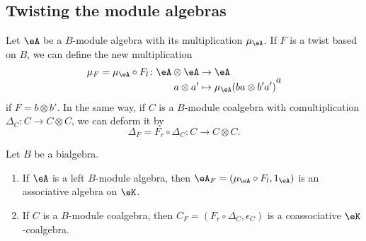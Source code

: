 \subsection{Twisting the module algebras}

Let $\eA$ be a $B$-module algebra with its multiplication $\mu_{\eA}$. If $F$ is a twist based on $B$, we can define the new multiplication
\begin{equation}
	\begin{aligned}
		\mu_F=\mu_{\eA}\circ F_l\colon \eA\otimes\eA&\to \eA \\
		a\otimes a'&\mapsto \mu_{\eA}(ba\otimes b'a')
	\end{aligned}
a\end{equation}
if $F=b\otimes b'$. In the same way, if $C$ is a $B$-module coalgebra with comultiplication $\Delta_C\colon C\to C\otimes C$, we can deform it by
\begin{equation}
	\Delta_F=F_r\circ\Delta_C\colon C\to C\otimes C.
\end{equation}

\begin{theorem}		\label{ThoTwistAlgEtCoalg}
	Let $B$ be a bialgebra.
	\begin{enumerate}

		\item
			If $\eA$ is a left $B$-module algebra, then $\eA_F=(\mu_{\eA}\circ F_l,1_{\eA})$ is an associative algebra on $\eK$.
		\item
			If $C$ is a $B$-module coalgebra, then $C_F=(F_r\circ\Delta_C,\epsilon_C)$ is a coassociative $\eK$-coalgebra.

	\end{enumerate}
\end{theorem}

